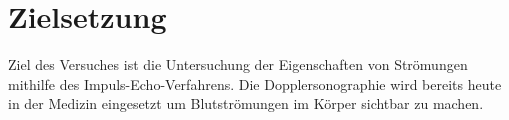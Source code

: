 \section{Zielsetzung}
\label{sec:Zielsetzung}
Ziel des Versuches ist die Untersuchung der Eigenschaften von Strömungen mithilfe des Impuls-Echo-Verfahrens.
Die Dopplersonographie wird bereits heute in der Medizin eingesetzt um Blutströmungen im Körper sichtbar zu machen.